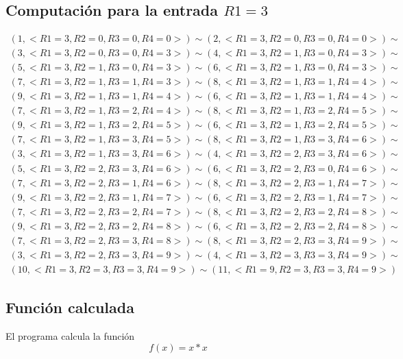 		\subsection{Computación para la entrada $R1=3$}
		\begin{equation*}\begin{gathered}
		(1, <R1=3, R2=0, R3=0, R4=0>) \sim (2, <R1=3, R2=0, R3=0, R4=0>) \sim\\
		(3, <R1=3, R2=0, R3=0, R4=3>) \sim (4, <R1=3, R2=1, R3=0, R4=3>) \sim\\
		(5, <R1=3, R2=1, R3=0, R4=3>) \sim (6, <R1=3, R2=1, R3=0, R4=3>) \sim\\
		(7, <R1=3, R2=1, R3=1, R4=3>) \sim (8, <R1=3, R2=1, R3=1, R4=4>) \sim\\
		(9, <R1=3, R2=1, R3=1, R4=4>) \sim (6, <R1=3, R2=1, R3=1, R4=4>) \sim\\
		(7, <R1=3, R2=1, R3=2, R4=4>) \sim (8, <R1=3, R2=1, R3=2, R4=5>) \sim\\
		(9, <R1=3, R2=1, R3=2, R4=5>) \sim (6, <R1=3, R2=1, R3=2, R4=5>) \sim\\
		(7, <R1=3, R2=1, R3=3, R4=5>) \sim (8, <R1=3, R2=1, R3=3, R4=6>) \sim\\
		(3, <R1=3, R2=1, R3=3, R4=6>) \sim (4, <R1=3, R2=2, R3=3, R4=6>) \sim\\
		(5, <R1=3, R2=2, R3=3, R4=6>) \sim (6, <R1=3, R2=2, R3=0, R4=6>) \sim\\
		(7, <R1=3, R2=2, R3=1, R4=6>) \sim (8, <R1=3, R2=2, R3=1, R4=7>) \sim\\
		(9, <R1=3, R2=2, R3=1, R4=7>) \sim (6, <R1=3, R2=2, R3=1, R4=7>) \sim\\
		(7, <R1=3, R2=2, R3=2, R4=7>) \sim (8, <R1=3, R2=2, R3=2, R4=8>) \sim\\
		(9, <R1=3, R2=2, R3=2, R4=8>) \sim (6, <R1=3, R2=2, R3=2, R4=8>) \sim\\
		(7, <R1=3, R2=2, R3=3, R4=8>) \sim (8, <R1=3, R2=2, R3=3, R4=9>) \sim\\
		(3, <R1=3, R2=2, R3=3, R4=9>) \sim (4, <R1=3, R2=3, R3=3, R4=9>) \sim\\
		(10, <R1=3, R2=3, R3=3, R4=9>) \sim (11, <R1=9, R2=3, R3=3, R4=9>)
		\end{gathered}\end{equation*}
		\subsection{Función calculada}
		El programa calcula la función
		\begin{equation*}
  			f(x) = x*x
  		\end{equation*}
